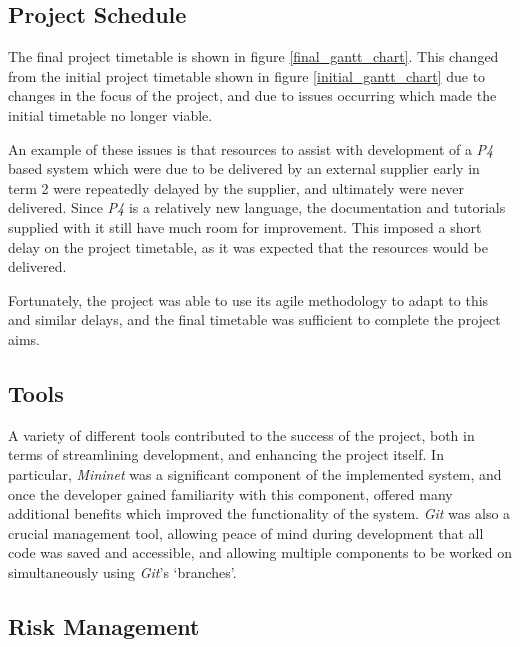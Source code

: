 \subsection{Project Schedule}
The final project timetable is shown in figure \ref{final_gantt_chart}. This changed from the initial project timetable shown in figure \ref{initial_gantt_chart} due to changes in the focus of the project, and due to issues occurring which made the initial timetable no longer viable.

An example of these issues is that resources to assist with development of a \textit{P4} based system which were due to be delivered by an external supplier early in term 2 were repeatedly delayed by the supplier, and ultimately were never delivered.
Since \textit{P4} is a relatively new language, the documentation and tutorials supplied with it still have much room for improvement. This imposed a short delay on the project timetable, as it was expected that the resources would be delivered.

Fortunately, the project was able to use its agile methodology to adapt to this and similar delays, and the final timetable was sufficient to complete the project aims.

\subsection{Tools}
A variety of different tools contributed to the success of the project, both in terms of streamlining development, and enhancing the project itself. In particular, \textit{Mininet} was a significant component of the implemented system, and once the developer gained familiarity with this component, offered many additional benefits which improved the functionality of the system. \textit{Git} was also a crucial management tool, allowing peace of mind during development that all code was saved and accessible, and allowing multiple components to be worked on simultaneously using \textit{Git}'s `branches'.


\subsection{Risk Management}


